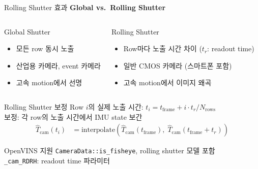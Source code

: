 \begin{frame}[shrink=10]{Rolling Shutter 효과}
  \textbf{Global vs.\ Rolling Shutter}
  \vspace{0.2em}
  \begin{columns}[T]
      \begin{block}{Global Shutter}
        \begin{itemize}
          \item 모든 row 동시 노출
          \item 산업용 카메라, event 카메라
          \item 고속 motion에서 선명
        \end{itemize}
      \end{block}
      \begin{block}{Rolling Shutter}
        \begin{itemize}
          \item Row마다 노출 시간 차이 ($t_r$: readout time)
          \item 일반 CMOS 카메라 (스마트폰 포함)
          \item 고속 motion에서 이미지 왜곡
        \end{itemize}
      \end{block}
  \end{columns}
  \begin{block}{Rolling Shutter 보정}
    Row $i$의 실제 노출 시간: $t_i = t_{\text{frame}} + i \cdot t_r / N_{\text{rows}}$\\
    보정: 각 row의 노출 시간에서 IMU state 보간
    \begin{align*}
      \hat{T}_{\text{cam}}(t_i) &= \text{interpolate}(\hat{T}_{\text{cam}}(t_{\text{frame}}),\;
      \hat{T}_{\text{cam}}(t_{\text{frame}} + t_r))
    \end{align*}
  \end{block}
  \begin{exampleblock}{OpenVINS 지원}
    \texttt{CameraData::is\_fisheye}, rolling shutter 모델 포함\\
    \texttt{\_cam\_RDRH}: readout time 파라미터
  \end{exampleblock}
\end{frame}


